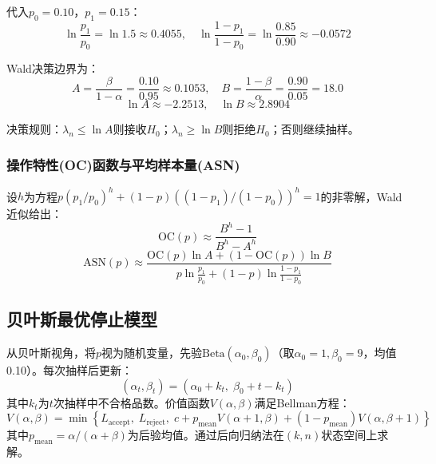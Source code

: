 \documentclass[12pt,a4paper]{ctexart}
\begin{document}
代入$p_0=0.10$，$p_1=0.15$：
\begin{equation}
    \ln\frac{p_1}{p_0} = \ln 1.5 \approx 0.4055, \quad
    \ln\frac{1-p_1}{1-p_0} = \ln\frac{0.85}{0.90} \approx -0.0572
\end{equation}

Wald决策边界为：
\begin{equation}
    A = \frac{\beta}{1-\alpha} = \frac{0.10}{0.95} \approx 0.1053, \quad
    B = \frac{1-\beta}{\alpha} = \frac{0.90}{0.05} = 18.0
\end{equation}
\begin{equation}
    \ln A \approx -2.2513, \quad \ln B \approx 2.8904
\end{equation}

决策规则：$\lambda_n \leq \ln A$则接收$H_0$；$\lambda_n \geq \ln B$则拒绝$H_0$；否则继续抽样。

\subsubsection{操作特性(OC)函数与平均样本量(ASN)}

设$h$为方程$p(p_1/p_0)^h + (1-p)((1-p_1)/(1-p_0))^h = 1$的非零解，Wald近似给出：
\begin{equation}
    \text{OC}(p) \approx \frac{B^h - 1}{B^h - A^h}
\end{equation}
\begin{equation}
    \text{ASN}(p) \approx \frac{\text{OC}(p) \ln A + (1-\text{OC}(p)) \ln B}
    {p \ln\frac{p_1}{p_0} + (1-p) \ln\frac{1-p_1}{1-p_0}}
\end{equation}

\subsection{贝叶斯最优停止模型}

从贝叶斯视角，将$p$视为随机变量，先验$\text{Beta}(\alpha_0,\beta_0)$（取$\alpha_0=1,\beta_0=9$，均值0.10）。每次抽样后更新：
\begin{equation}
    (\alpha_t, \beta_t) = (\alpha_0 + k_t,\; \beta_0 + t - k_t)
\end{equation}
其中$k_t$为$t$次抽样中不合格品数。价值函数$V(\alpha,\beta)$满足Bellman方程：
\begin{equation}
    V(\alpha, \beta) = \min \left\{
    L_{\text{accept}},\; L_{\text{reject}},\;
    c + p_{\text{mean}} V(\alpha+1,\beta) + (1-p_{\text{mean}}) V(\alpha,\beta+1)
    \right\}
\end{equation}
其中$p_{\text{mean}} = \alpha/(\alpha+\beta)$为后验均值。通过后向归纳法在$(k,n)$状态空间上求解。
\end{document}
